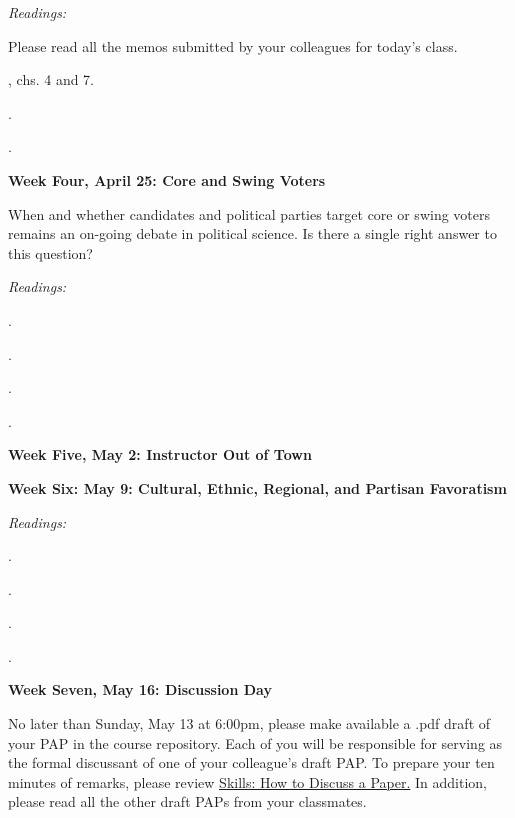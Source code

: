 \documentclass[11pt]{article}
\begin{document}
\textit{Readings:}

Please read all the memos submitted by your colleagues for today's class. 

, chs. 4 and 7. 

\href{http://link.springer.com/article/10.1007\%2FBF00124924?LI=true}{}. 

\href{http://dx.doi.org/10.2307/2960152}{}. 

\textbf{Week Four, April 25: Core and Swing Voters}

When and whether candidates and political parties target core or swing voters remains an on-going debate in political science. 
Is there a single right answer to this question?

\textit{Readings:}

\href{http://dx.doi.org/10.1017/S0003055402004215 }{}.

\href{http://dx.doi.org/10.1017/S0003055405051683}{}.

\href{http://dx.doi.org/10.1017/S0003055408080106}{}. 

\href{http://dx.doi.org/10.1017/CBO9780511585869.008}{}.

\textbf{Week Five, May 2: Instructor Out of Town}


\textbf{Week Six: May 9: Cultural, Ethnic, Regional, and Partisan Favoratism}

\textit{Readings:}

\href{http://dx.doi.org/10.1017/S0003055412000172}{}.

\href{DOI: http://dx.doi.org/10.1017/S1537592713001035}{}. 

\href{http://dx.doi.org/10.1017/S0003055412000573}{}. 

\href{http://journals.sagepub.com/doi/abs/10.1177/0010414012463876}{}.

\textbf {Week Seven, May 16: Discussion Day}

No later than Sunday, May 13 at 6:00pm, please make available a .pdf draft of your PAP in the course repository. Each of you will be responsible for serving as the formal discussant of one of your colleague's
draft PAP. To prepare your ten minutes of remarks, please review \href{}{Skills: How to Discuss a Paper.}  In addition, please read all the other draft PAPs from your classmates.
\end{document}
